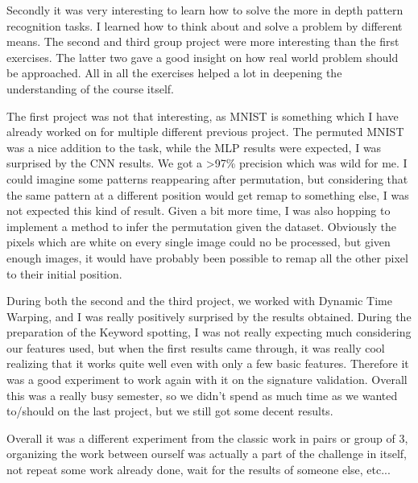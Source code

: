 \documentclass{homework}
\begin{document}
Secondly it was very interesting to learn how to solve the more in depth pattern recognition tasks. I learned how to think about and solve a problem by different means. The second and third group project were more interesting than the first exercises. The latter two gave a good insight on how real world problem should be approached. All in all the exercises helped a lot in deepening the understanding of the course itself. 

The first project was not that interesting, as MNIST is something which I have already worked on for multiple different previous project. The permuted MNIST was a nice addition to the task, while the MLP results were expected, I was surprised by the CNN results. We got a >97\% precision which was wild for me. I could imagine some patterns reappearing after permutation, but considering that the same pattern at a different position would get remap to something else, I was not expected this kind of result. Given a bit more time, I was also hopping to implement a method to infer the permutation given the dataset. Obviously the pixels which are white on every single image could no be processed, but given enough images, it would have probably been possible to remap all the other pixel to their initial position. 

During both the second and the third project, we worked with Dynamic Time Warping, and I was really positively surprised by the results obtained. During the preparation of the Keyword spotting, I was not really expecting much considering our features used, but when the first results came through, it was really cool realizing that it works quite well even with only a few basic features. Therefore it was a good experiment to work again with it on the signature validation. Overall this was a really busy semester, so we didn't spend as much time as we wanted to/should on the last project, but we still got some decent results.

Overall it was a different experiment from the classic work in pairs or group of 3, organizing the work between ourself was actually a part of the challenge in itself, not repeat some work already done, wait for the results of someone else, etc... 
\end{document}
